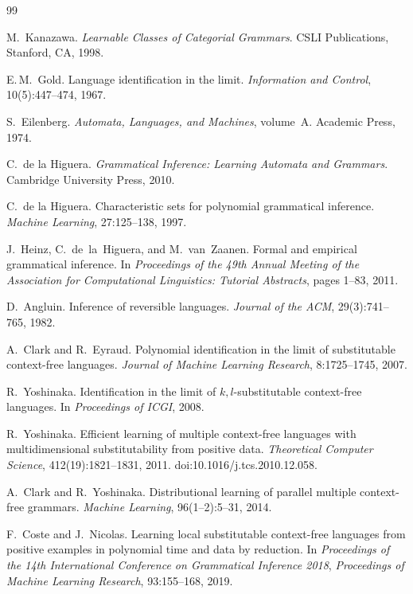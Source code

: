 \documentclass[11pt,a4paper]{article}
\begin{document}
\begin{thebibliography}{99}

M.~Kanazawa.
\newblock \emph{Learnable Classes of Categorial Grammars}.
\newblock CSLI Publications, Stanford, CA, 1998.


E.\,M.~Gold.
Language identification in the limit.
\textit{Information and Control}, 10(5):447--474, 1967.

S.~Eilenberg.
\textit{Automata, Languages, and Machines}, volume~A.
Academic Press, 1974.

C.~de la Higuera.
\textit{Grammatical Inference: Learning Automata and Grammars}.
Cambridge University Press, 2010.

C.~de la Higuera.
Characteristic sets for polynomial grammatical inference.
\textit{Machine Learning}, 27:125--138, 1997.

J.~Heinz, C.~de~la~Higuera, and M.~van~Zaanen.
\newblock Formal and empirical grammatical inference.
\newblock In \emph{Proceedings of the 49th Annual Meeting of the Association
for Computational Linguistics: Tutorial Abstracts}, pages 1--83, 2011.

D.~Angluin.
Inference of reversible languages.
\textit{Journal of the ACM}, 29(3):741--765, 1982.

A.~Clark and R.~Eyraud.
Polynomial identification in the limit of substitutable
context-free languages.
\textit{Journal of Machine Learning Research},
8:1725--1745, 2007.

R.~Yoshinaka.
Identification in the limit of $k, l$-substitutable
context-free languages.
In \textit{Proceedings of ICGI}, 2008.

R.~Yoshinaka.
Efficient learning of multiple context-free languages with
multidimensional substitutability from positive data.
\textit{Theoretical Computer Science},
412(19):1821--1831, 2011.
doi:10.1016/j.tcs.2010.12.058.

A.~Clark and R.~Yoshinaka.
Distributional learning of parallel multiple context-free
grammars.
\textit{Machine Learning}, 96(1--2):5--31, 2014.

F.~Coste and J.~Nicolas.
Learning local substitutable context-free languages from positive
examples in polynomial time and data by reduction.
In \textit{Proceedings of the 14th International Conference on
Grammatical Inference 2018},
\textit{Proceedings of Machine Learning Research},
93:155--168, 2019.


\end{thebibliography}
\end{document}
